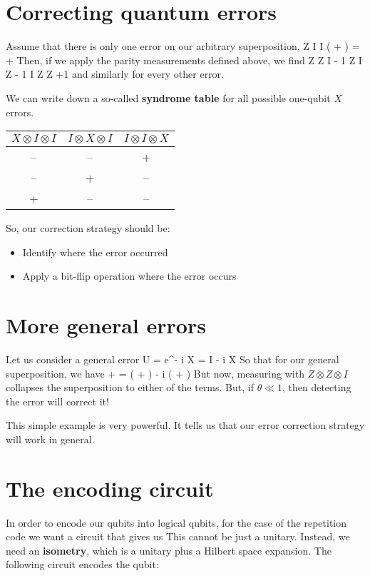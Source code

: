 \section{Correcting quantum errors}
Assume that there is only one error on our arbitrary superposition, 
\beq
Z \otimes I \otimes I \left( \alpha {} + \beta {} \right) = \alpha {} + \beta {} 
\eeq
Then, if we apply the parity measurements defined above, we find
\beq
Z \otimes Z \otimes I \rightarrow - 1
\eeq
\beq
Z \otimes I \otimes Z \rightarrow - 1 
\eeq
\beq
I \otimes Z \otimes Z \rightarrow +1
\eeq
and similarly for every other error. 

We can write down a so-called \textbf{syndrome table} for all possible one-qubit $X$ errors. 

\begin{tabular}{|c|c|c|}
$X\otimes I \otimes I $& $I \otimes X \otimes I$ & $I \otimes I \otimes X$ \\ \hline
--  &-- & + \\ \hline
-- & + & -- \\ \hline
+ & -- & --  \\ \hline
\end{tabular}

So, our correction strategy should be:
\begin{itemize}
\item Identify where the error occurred 
\item Apply a bit-flip operation where the error occurs
\end{itemize}

\section{More general errors}
Let us consider a general error
\beq
U = e^{- i \theta X} = \cos{\theta} I - i \sin{\theta} X
\eeq
So that for our general superposition, we have
\beq
\alpha {} + \beta {} = \cos{\theta} \left( \alpha {} + \beta {} \right) - i \sin{\theta} \left( \alpha {} + \beta {} \right)
\eeq
But now, measuring with $Z\otimes Z \otimes I$ collapses the superposition to either of the terms. But, if $\theta \ll 1$, then detecting the error will correct it!

This simple example is very powerful. It tells us that our error correction strategy will work in general. 


\section{The encoding circuit}
In order to encode our qubits into logical qubits, for the case of the repetition code we want a circuit that gives us
\beq
\alpha {} \rightarrow \alpha {}
\eeq
This cannot be just a unitary. Instead, we need an \textbf{isometry}, which is a unitary plus a Hilbert space expansion. The following circuit encodes the qubit:

